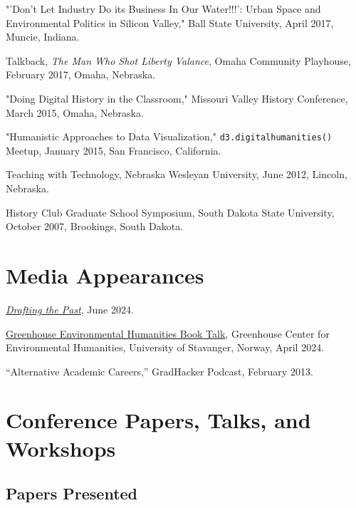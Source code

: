 \documentclass[10pt]{article}
\begin{document}
"'Don't Let Industry Do its Business In Our Water!!!': Urban Space and Environmental Politics in Silicon Valley," Ball State University, April 2017, Muncie, Indiana.

Talkback, \textit{The Man Who Shot Liberty Valance}, Omaha Community Playhouse, February 2017, Omaha, Nebraska.

"Doing Digital History in the Classroom," Missouri Valley History Conference, March 2015, Omaha, Nebraska.

"Humanistic Approaches to Data Visualization," \texttt{d3.digitalhumanities()} Meetup, January 2015, San Francisco, California.

Teaching with Technology, Nebraska Wesleyan University, June 2012, Lincoln, Nebraska.

History Club Graduate School Symposium, South Dakota State University, October 2007, Brookings, South Dakota.

\section{Media Appearances}

\href{https://draftingthepast.com/podcast-episodes/episode-45-jason-heppler-wants-tools-that-fit-his-questions/}{\textit{Drafting the Past}}, June 2024.

\href{https://vimeo.com/947498919}{Greenhouse Environmental Humanities Book Talk}, Greenhouse Center for Environmental Humanities, University of Stavanger, Norway, April 2024.

``Alternative Academic Careers,'' GradHacker Podcast, February 2013.

\section*{Conference Papers, Talks, and Workshops}

\subsection*{Papers Presented}
\end{document}
